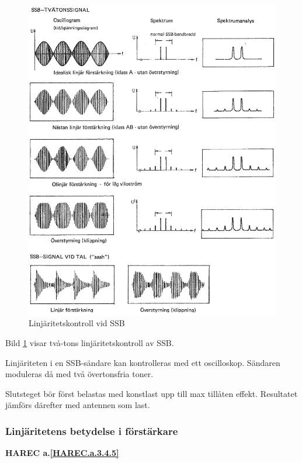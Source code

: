 \begin{figure}
\includegraphics[width=\textwidth]{images/cropped_pdfs/bild_2_3-53.pdf}
\caption{Linjäritetskontroll vid SSB}
\label{fig:BildII3-53}
\end{figure}

Bild \ref{fig:BildII3-53} visar två-tons linjäritetskontroll av SSB.

Linjäriteten i en SSB-sändare kan kontrolleras med ett oscilloskop.
Sändaren moduleras då med två övertonsfria toner.

Slutsteget bör först belastas med konstlast upp till max tillåten effekt.
Resultatet jämförs därefter med antennen som last.

\subsubsection{Linjäritetens betydelse i förstärkare}
\textbf{HAREC a.\ref{HAREC.a.3.4.5}\label{myHAREC.a.3.4.5}}

